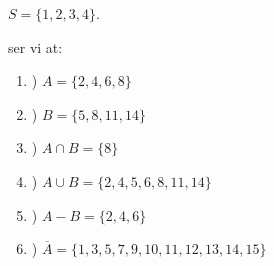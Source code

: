 \documentclass[20pt]{article}
\begin{document}
\hfil $S=\{1,2,3,4\}$.


\noindent ser vi at:
\begin{enumerate}[label=\alph*]
    \item) $A  = \{ 2,4,6,8 \}$
    \item) $B = \{ 5,8,11,14 \}$
    \item) $A \cap B = \{ 8 \}$
    \item) $A \cup B = \{ 2,4,5,6,8,11,14 \}$
    \item) $A - B = \{ 2,4,6 \}$
    \item) $\overline{A} = \{ 1,3,5,7,9,10,11,12,13,14,15 \}$
\end{enumerate}

	
	
	
	
\end{document}
